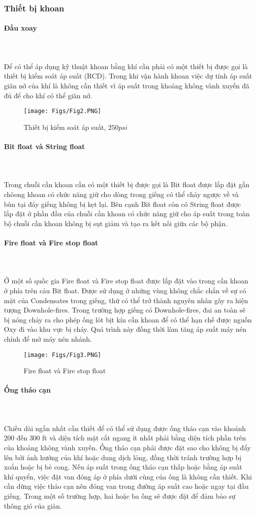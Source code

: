 \documentclass[12pt,a4paper]{article}
\newcommand{\subsubsubsection}[1]{\paragraph{#1}\mbox{}\\}
\begin{document}
\subsubsection{Thiết bị khoan}
\subsubsubsection{Đầu xoay} \\
	Để có thể áp dụng kỹ thuật khoan bằng khí cần phải có một thiết bị được gọi là thiết bị kiểm soát áp suất (RCD). Trong khi vận hành khoan việc dự tính áp suất giãn nở của khí là không cần thiết vì áp suất trong khoảng không vành xuyến đã đủ để cho khí có thể giãn nở. 
	\clearpage
	\begin{figure}[h]
	\centering
	\texttt{[image: Figs/Fig2.PNG]}
	\caption{Thiết bị kiểm soát áp suất\cite{rehm2013underbalanced}, $250 psi$}
	\end{figure}
\subsubsubsection{Bit float và String float} \\
	Trong chuỗi cần khoan cần có một thiết bị được gọi là Bit float được lắp đặt gần chòong khoan có chức năng giữ cho dòng trong giếng có thể chảy ngược về và bùn tại đáy giếng không bị kẹt lại. Bên cạnh Bit float còn có String float được lắp đặt ở phần đầu của chuỗi cần khoan có chức năng giữ cho áp suất trong toàn bộ chuỗi cần khoan không bị sụt giảm và tạo ra kết nối giữa các bộ phận.
\subsubsubsection{Fire float và Fire stop float} \\
	Ở một số quốc gia Fire float và Fire stop float được lắp đặt vào trong cần khoan ở phía trên cảu Bit float. Được sử dụng ở những vùng không chắc chắn về sự có mặt của Condensates trong giếng, thứ có thể trở thành nguyên nhân gây ra hiện tượng Downhole-fires. Trong trường hợp giếng có Downhole-fires, đai an toàn sẽ bị nóng chảy ra cho phép ống lót bịt kín cần khoan để có thể hạn chế được nguồn Oxy đi vào khu vực bị cháy. Quá trình này đồng thời làm tăng áp suất máy nén chính để mở máy nén nhánh.
	\begin{figure}[h]
	\centering
	\texttt{[image: Figs/Fig3.PNG]}
	\caption{Fire float và Fire stop float\cite{rehm2013underbalanced}}
	\end{figure}
\subsubsubsection{Ống tháo cạn}\\
	Chiều dài ngắn nhất cần thiết để có thể sử dụng được ống tháo cạn vào khoảnh 200 đến 300 ft và diện tích mặt cắt ngang ít nhất phải bằng diện tích phần trên của khoảng không vành xuyến. Ống tháo cạn phải được đặt sao cho không bị đẩy lên bởi ảnh hưởng của khí hoặc dung dịch lỏng, đồng thời tránh trường hợp bị xoắn hoặc bị bẻ cong. Nếu áp suất trong ống tháo cạn thấp hoặc bằng áp suất khí quyển, việc đặt van đóng áp ở phía dưới cùng của ống là không cần thiết. Khi cần dừng việc tháo cạn nên đóng van trong đường áp suất cao hoặc ngay tại đầu giếng. Trong một số trường hợp, hai hoặc ba ống sẽ được đặt để đảm bảo sự thông gió của giàn.
\end{document}
